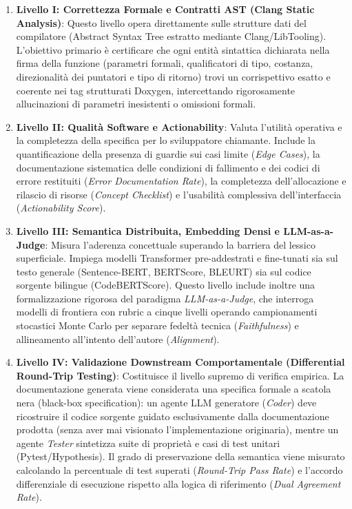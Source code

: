 \begin{enumerate}
    \item \textbf{Livello I: Correttezza Formale e Contratti AST (Clang Static Analysis)}: Questo livello opera direttamente sulle strutture dati del compilatore (Abstract Syntax Tree estratto mediante Clang/LibTooling). L'obiettivo primario è certificare che ogni entità sintattica dichiarata nella firma della funzione (parametri formali, qualificatori di tipo, costanza, direzionalità dei puntatori e tipo di ritorno) trovi un corrispettivo esatto e coerente nei tag strutturati Doxygen, intercettando rigorosamente allucinazioni di parametri inesistenti o omissioni formali.
    \item \textbf{Livello II: Qualità Software e Actionability}: Valuta l'utilità operativa e la completezza della specifica per lo sviluppatore chiamante. Include la quantificazione della presenza di guardie sui casi limite (\emph{Edge Cases}), la documentazione sistematica delle condizioni di fallimento e dei codici di errore restituiti (\emph{Error Documentation Rate}), la completezza dell'allocazione e rilascio di risorse (\emph{Concept Checklist}) e l'usabilità complessiva dell'interfaccia (\emph{Actionability Score}).
    \item \textbf{Livello III: Semantica Distribuita, Embedding Densi e LLM-as-a-Judge}: Misura l'aderenza concettuale superando la barriera del lessico superficiale. Impiega modelli Transformer pre-addestrati e fine-tunati sia sul testo generale (Sentence-BERT, BERTScore, BLEURT) sia sul codice sorgente bilingue (CodeBERTScore). Questo livello include inoltre una formalizzazione rigorosa del paradigma \emph{LLM-as-a-Judge}, che interroga modelli di frontiera con rubric a cinque livelli operando campionamenti stocastici Monte Carlo per separare fedeltà tecnica (\emph{Faithfulness}) e allineamento all'intento dell'autore (\emph{Alignment}).
    \item \textbf{Livello IV: Validazione Downstream Comportamentale (Differential Round-Trip Testing)}: Costituisce il livello supremo di verifica empirica. La documentazione generata viene considerata una specifica formale a scatola nera (black-box specification): un agente LLM generatore (\emph{Coder}) deve ricostruire il codice sorgente guidato esclusivamente dalla documentazione prodotta (senza aver mai visionato l'implementazione originaria), mentre un agente \emph{Tester} sintetizza suite di proprietà e casi di test unitari (Pytest/Hypothesis). Il grado di preservazione della semantica viene misurato calcolando la percentuale di test superati (\emph{Round-Trip Pass Rate}) e l'accordo differenziale di esecuzione rispetto alla logica di riferimento (\emph{Dual Agreement Rate}).
\end{enumerate}

